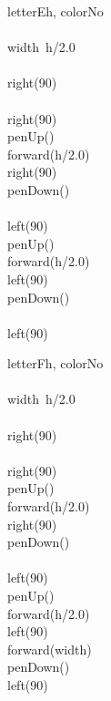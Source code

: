 \documentclass[a4paper,10pt]{article}
\begin{document}
\begin{pseudocode}{letterE}{h, colorNo }
\label{letterE}
\\
\\
  width\gets\ h/2.0\\
  \\
  right(90)\\
  \\
  right(90)\\
  penUp()\\
  forward(h/2.0)\\
  right(90)\\
  penDown()\\
  \\
  left(90)\\
  penUp()\\
  forward(h/2.0)\\
  left(90)\\
  penDown()\\
  \\
  left(90)\\
\ENDPROCEDURE
\end{pseudocode}


\begin{pseudocode}{letterF}{h, colorNo }
\label{letterF}
\\
\\
  width\gets\ h/2.0\\
  \\
  right(90)\\
  \\
  right(90)\\
  penUp()\\
  forward(h/2.0)\\
  right(90)\\
  penDown()\\
  \\
  left(90)\\
  penUp()\\
  forward(h/2.0)\\
  left(90)\\
  forward(width)\\
  penDown()\\
  left(90)\\
\ENDPROCEDURE
\end{pseudocode}
\end{document}
